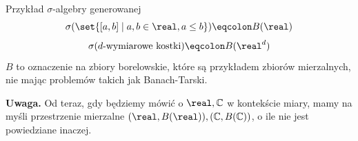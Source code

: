 \begin{example}
	\label{borel-set}
	Przykład \(\sigma\)-algebry generowanej
	\[
		\sigma(\set{[a, b] \mid a, b \in \real, a \leq b}) \eqcolon B(\real)
	\]
	\[
		\sigma(d\text{-wymiarowe kostki}) \eqcolon B(\real^d)
	\]
	\(B\) to oznaczenie na zbiory borelowskie, które są przykładem zbiorów mierzalnych, nie mając problemów takich jak Banach-Tarski.

	\textbf{Uwaga. } Od teraz, gdy będziemy mówić o \(\real, \mathbb{C}\) w kontekście miary, mamy na myśli przestrzenie mierzalne \((\real, B(\real)), (\mathbb{C}, B(\mathbb{C}))\), o ile nie jest powiedziane inaczej.
\end{example}
